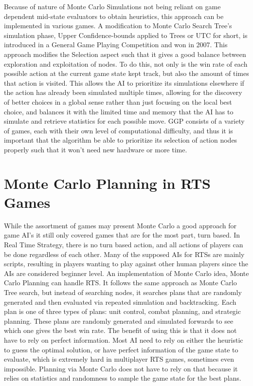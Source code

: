 \documentclass[11pt]{article}
\begin{document}
Because of nature of Monte Carlo Simulations not being reliant on game dependent mid-state evaluators to obtain heuristics, this approach can be implemented in various games. A modification to Monte Carlo Search Tree’s simulation phase, Upper Confidence-bounds applied to Trees or UTC for short, is introduced in a General Game Playing Competition and won in 2007. \cite{finnsson2008simulation} This approach modifies the Selection aspect such that it gives a good balance between exploration and exploitation of nodes. To do this, not only is the win rate of each possible action at the current game state kept track, but also the amount of times that action is visited. This allows the AI to prioritize its simulations elsewhere if the action has already been simulated multiple times, allowing for the discovery of better choices in a global sense rather than just focusing on the local best choice, and balances it with the limited time and memory that the AI has to simulate and retrieve statistics for each possible move. GGP consists of a variety of games, each with their own level of computational difficulty, and thus it is important that the algorithm be able to prioritize its selection of action nodes properly such that it won’t need new hardware or more time.

\section{Monte Carlo Planning in RTS Games}

While the assortment of games may present Monte Carlo a good approach for game AI’s it still only covered games that are for the most part, turn based. In Real Time Strategy, there is no turn based action, and all actions of players can be done regardless of each other. Many of the supposed AIs for RTSs are mainly scripts, resulting in players wanting to play against other human players since the AIs are considered beginner level. An implementation of Monte Carlo idea, Monte Carlo Planning can handle RTS. It follows the same approach as Monte Carlo Tree search, but instead of searching nodes, it searches plans that are randomly generated and then evaluated via repeated simulation and backtracking. Each plan is one of three types of plans: unit control, combat planning, and strategic planning. \cite{chung2005monte} These plans are randomly generated and simulated forwards to see which one gives the best win rate. The benefit of using this is that it does not have to rely on perfect information. Most AI need to rely on either the heuristic to guess the optimal solution, or have perfect information of the game state to evaluate, which is extremely hard in multiplayer RTS games, sometimes even impossible. Planning via Monte Carlo does not have to rely on that because it relies on statistics and randomness to sample the game state for the best plans.
\end{document}
